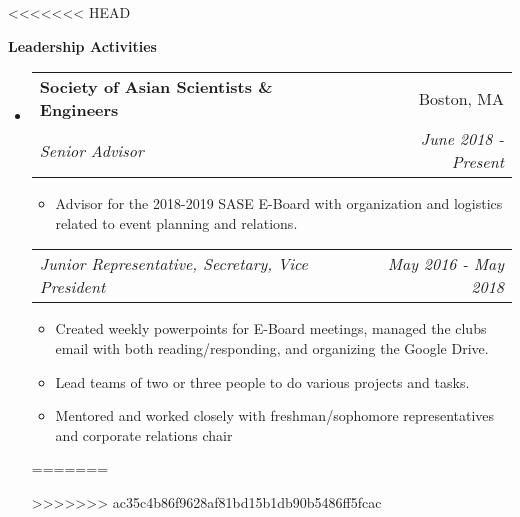 \documentclass[letterpaper, 8pt]{extarticle}
\makeatletter
\newcommand{\resitem}[1]{\item #1 \vspace{-2pt}}
\newcommand{\resheading}[1]{{\large \colorbox{mygrey}{\begin{minipage}{0.99\textwidth}{\textbf{#1 \vphantom{p\^{E}}}}\end{minipage}}}}
\newcommand{\ressubheading}[4]{
\begin{tabular*}{7.40in}{l@{\extracolsep{\fill}}r}
		\textbf{#1} & #2 \\
		\textit{#3} & \textit{#4} \\
\end{tabular*}\vspace{-6pt}}
\newcommand{\rehead}[2]{
\begin{tabular*}{7.40in}{l@{\extracolsep{\fill}}r}
        \textit{#1} & \textit{#2} \\
\end{tabular*}\vspace{-6pt}}
\makeatother
\begin{document}
<<<<<<< HEAD
\resheading{Leadership Activities}
\begin{itemize}
    \item 	\ressubheading{Society of Asian Scientists \& Engineers}{Boston, MA}{Senior Advisor}{June 2018 - Present}
    \begin{itemize} 
        \item Advisor for the 2018-2019 SASE E-Board with organization and logistics related to event planning and relations.
    \end{itemize} \vspace{-6pt}
    \rehead{Junior Representative, Secretary, Vice President}{May 2016 - May 2018}
    \begin{itemize} 
        \resitem{Created weekly powerpoints for E-Board meetings, managed the clubs email with both reading/responding, and organizing the Google Drive.}
        \resitem{Lead teams of two or three people to do various projects and tasks.}
        \resitem{Mentored and worked closely with freshman/sophomore representatives and corporate relations chair}
    \end{itemize}
=======

\begin{comment}
\resheading{Leadership Activities}
\begin{itemize}
    
>>>>>>> ac35c4b86f9628af81bd15b1db90b5486ff5fcac
    \item \ressubheading{Machine Intelligence Community}{Boston, MA}{Active Member/Speaker}{September 2018 - Present}
    \begin{itemize}
        \resitem{Contribute latest news regarding research in Artificial Intelligence to club.}
        \resitem{Gave talk, discussion, and demo on the \textit{Neural Ordinary Differential Equations} paper and research by Chen et.al}
    \end{itemize}
\end{itemize}
<<<<<<< HEAD
=======
\end{comment}


>>>>>>> ac35c4b86f9628af81bd15b1db90b5486ff5fcac

\begin{comment}
\resheading{Interests \& Activities}
Society of Asian Scientists and Engineers (SASE), IEEE Eta Kappu Nu ECE Honor Member of Society, Machine Intelligence Community (MIC Club), Mentoring, Tutoring, Travelling the world and experiencing new cultures, Learning Japanese \& Korean
\end{comment}



\end{itemize}
\end{document}
